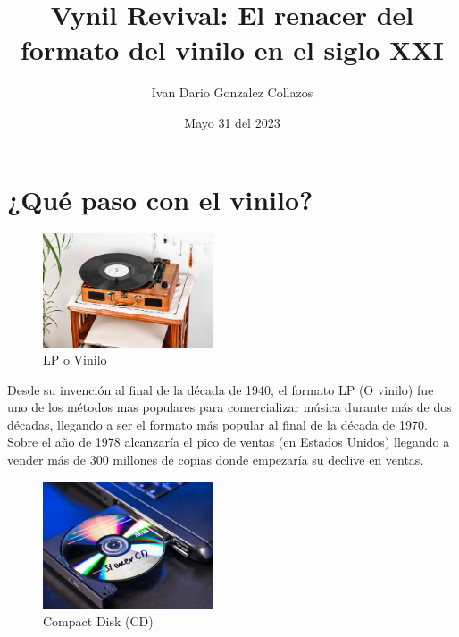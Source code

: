 \documentclass{article}
\title{Vynil Revival: El renacer del formato del vinilo en el siglo XXI}
\author{Ivan Dario Gonzalez Collazos}
\date{Mayo 31 del 2023}
\begin{document}
\maketitle

\section{¿Qué paso con el vinilo?}

\begingroup
\setlength{\intextsep}{0pt}%
\setlength{\columnsep}{0pt}%

\begin{figure}
    \centering
    \includegraphics[width=0.45\textwidth]{images/vynil.jpg}
    \vspace{-5pt}
    \caption{LP o Vinilo}
\end{figure}

Desde su invención al final de la década de 1940, el formato LP (O vinilo) fue uno de los métodos mas populares para comercializar música durante más de dos décadas, llegando a ser el formato más popular al final de la década de 1970. Sobre el año de 1978 alcanzaría el pico de ventas (en Estados Unidos) llegando a vender más de 300 millones de copias donde empezaría su declive en ventas.\cite{wikirevival}\\

\endgroup

\begingroup
\setlength{\intextsep}{0pt}%
\setlength{\columnsep}{0pt}%

\begin{figure}
    \centering
    \includegraphics[width=0.45\textwidth]{images/cd.jpg}
    \vspace{-5pt}
    \caption{Compact Disk (CD)}
\end{figure}
\end{document}
